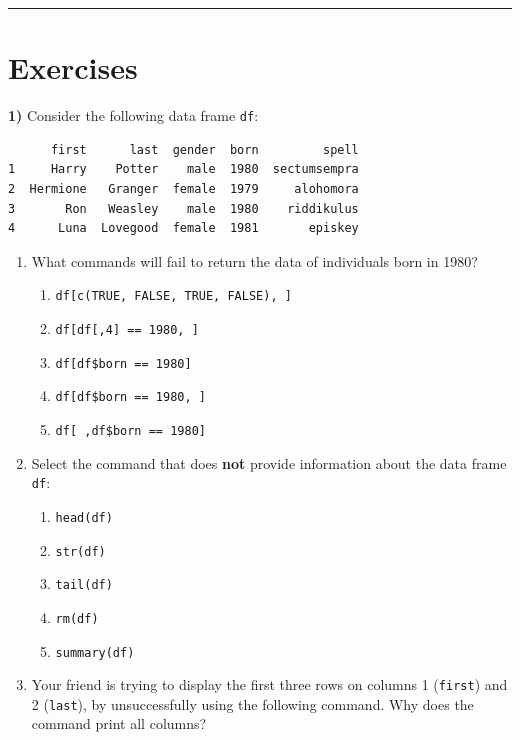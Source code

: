 \documentclass[
]{book}
\begin{document}
\begin{center}\rule{0.5\linewidth}{0.5pt}\end{center}

\hypertarget{exercises-3}{%
\section{Exercises}\label{exercises-3}}

\textbf{1)} Consider the following data frame \texttt{df}:

\begin{verbatim}
      first      last  gender  born         spell
1     Harry    Potter    male  1980  sectumsempra
2  Hermione   Granger  female  1979     alohomora
3       Ron   Weasley    male  1980    riddikulus
4      Luna  Lovegood  female  1981       episkey
\end{verbatim}

\begin{enumerate}
\def\labelenumi{\alph{enumi})}
\item
  What commands will fail to return the data of individuals born in 1980?

  \begin{enumerate}
  \def\labelenumii{\roman{enumii})}
  \item
    \texttt{df{[}c(TRUE,\ FALSE,\ TRUE,\ FALSE),\ {]}}
  \item
    \texttt{df{[}df{[},4{]}\ ==\ 1980,\ {]}}
  \item
    \texttt{df{[}df\$born\ ==\ 1980{]}}
  \item
    \texttt{df{[}df\$born\ ==\ 1980,\ {]}}
  \item
    \texttt{df{[}\ ,df\$born\ ==\ 1980{]}}
  \end{enumerate}
\item
  Select the command that does \textbf{not} provide information about the data
  frame \texttt{df}:

  \begin{enumerate}
  \def\labelenumii{\roman{enumii})}
  \item
    \texttt{head(df)}
  \item
    \texttt{str(df)}
  \item
    \texttt{tail(df)}
  \item
    \texttt{rm(df)}
  \item
    \texttt{summary(df)}
  \end{enumerate}
\item
  Your friend is trying to display the first three rows on columns 1 (\texttt{first})
  and 2 (\texttt{last}), by unsuccessfully using the following command.
  Why does the command print all columns?
\end{enumerate}
\end{document}
